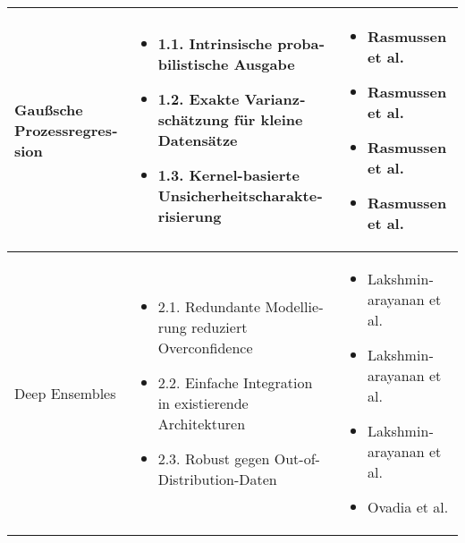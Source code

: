 \begin{otherlanguage}{ngerman}
\begin{table}[!htpb]
\begin{tabularx}{\textwidth}{|l|X|X|}
    \multirow{7}{*}{\gls{Gaußsche Prozessregression}} &
    \begin{itemize}[topsep=0em, itemsep=0em, leftmargin=*, label={}]
      \item 1.1. Intrinsische probabilistische Ausgabe
      \item 1.2. Exakte Varianzschätzung für kleine Datensätze
      \item 1.3. Kernel-basierte Unsicherheitscharakterisierung
    \end{itemize}
    &
    \begin{itemize}[topsep=0em, itemsep=0em, leftmargin=*, label={}]
      \item Rasmussen et al. \parencite[Kap.~2]{rasmussen2006gaussian}
      \item Rasmussen et al. \parencite[S.~16–17]{rasmussen2006gaussian}
      \item Rasmussen et al. \parencite[Kap.~2.2]{rasmussen2006gaussian}
      \item Rasmussen et al. \parencite[Kap.~4]{rasmussen2006gaussian}
    \end{itemize}
    \\ \hline

    \multirow{7}{*}{Deep Ensembles} &
    \begin{itemize}[topsep=0em, itemsep=0em, leftmargin=*, label={}]
      \item 2.1. Redundante Modellierung reduziert Overconfidence
      \item 2.2. Einfache Integration in existierende Architekturen
      \item 2.3. Robust gegen Out-of-Distribution-Daten
    \end{itemize}
    &
    \begin{itemize}[topsep=0em, itemsep=0em, leftmargin=*, label={}]
      \item Lakshminarayanan et al. \parencite{lakshminarayanan2017simple}
      \item Lakshminarayanan et al. \parencite[S.~3]{lakshminarayanan2017simple}
      \item Lakshminarayanan et al. \parencite[S.~5]{lakshminarayanan2017simple}
      \item Ovadia et al. \parencite{ovadia2019can}
    \end{itemize}
    \\ \hline


\end{tabularx}
\end{table}
\end{otherlanguage}
